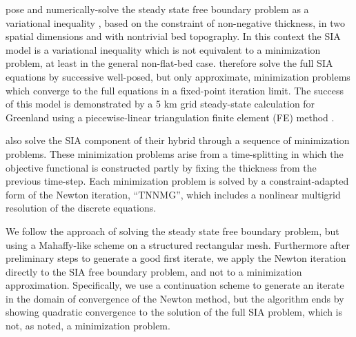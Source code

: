 \documentclass[twocolumn,letterpaper]{igs}
\begin{document}
\cite{JouvetBueler2012} pose and numerically-solve the steady state free boundary problem as a variational inequality \citep{KinderlehrerStampacchia1980}, based on the constraint of non-negative thickness, in two spatial dimensions and with nontrivial bed topography.  In this context the SIA model is a variational inequality which is not equivalent to a minimization problem, at least in the general non-flat-bed case.  \cite{JouvetBueler2012} therefore solve the full SIA equations by successive well-posed, but only approximate, minimization problems which converge to the full equations in a fixed-point iteration limit.  The success of this model is demonstrated by a 5 km grid steady-state calculation for Greenland using a piecewise-linear triangulation finite element (FE) method \citep{Elmanetal2005}.

\cite{JouvetGraeser2013} also solve the SIA component of their hybrid through a sequence of minimization problems.  These minimization problems arise from a time-splitting in which the objective functional is constructed partly by fixing the thickness from the previous time-step.  Each minimization problem is solved by a constraint-adapted form of the Newton iteration, ``TNNMG'', which includes a nonlinear multigrid resolution of the discrete equations.

We follow the \cite{JouvetBueler2012} approach of solving the steady state free boundary problem, but using a Mahaffy-like scheme on a structured rectangular mesh.  Furthermore after preliminary steps to generate a good first iterate, we apply the Newton iteration directly to the SIA free boundary problem, and not to a minimization approximation.  Specifically, we use a continuation scheme to generate an iterate in the domain of convergence of the Newton method, but the algorithm ends by showing quadratic convergence to the solution of the full SIA problem, which is not, as noted, a minimization problem.
\end{document}
